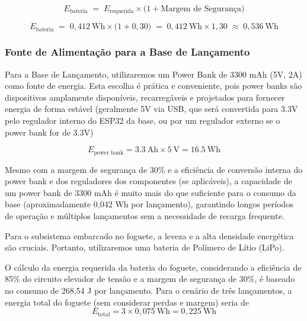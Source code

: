 \begin{equation}
E_{\text{bateria}}
\;=\;
E_{\text{requerida}}
\times
\bigl(1 + \text{Margem de Segurança}\bigr)
\end{equation}

\begin{equation}
E_{\text{bateria}}
\;=\;
0,412~\mathrm{Wh}
\times
\bigl(1 + 0{,}30\bigr)
\;=\;
0,412~\mathrm{Wh}
\times
1{,}30
\;\approx\;
0,536~\mathrm{Wh}
\end{equation}

\subsubsection{Fonte de Alimentação para a Base de Lançamento}


Para a Base de Lançamento, utilizaremos um Power Bank de 3300 mAh (5V, 2A) como fonte de energia. Esta escolha é prática e conveniente, pois power banks são dispositivos amplamente disponíveis, recarregáveis e projetados para fornecer energia de forma estável (geralmente 5V via USB, que será convertida para 3.3V pelo regulador interno do ESP32 da base, ou por um regulador externo se o power bank for de 3.3V) 

\begin{equation}
E_{\text{power bank}}
= 3.3~\mathrm{Ah} \times 5~\mathrm{V}
= 16.5~\mathrm{Wh}
\end{equation}

Mesmo com a margem de segurança de 30\% e a eficiência de conversão interna do power bank e dos reguladores dos componentes (se aplicáveis), a capacidade de um power bank de 3300 mAh é muito mais do que suficiente para o consumo da base (aproximadamente 0,042 Wh por lançamento), garantindo longos períodos de operação e múltiplos lançamentos sem a necessidade de recarga frequente. 


Para o subsistema embarcado no foguete, a leveza e a alta densidade energética são cruciais. Portanto, utilizaremos uma bateria de Polímero de Lítio (LiPo). 

O cálculo da energia requerida da bateria do foguete, considerando a eficiência de 85\% do circuito elevador de tensão e a margem de segurança de 30\%, é baseado no consumo de 268,54 J por lançamento. Para o cenário de três lançamentos, a energia total do foguete (sem considerar perdas e margem) seria de
\begin{equation}
E_{\text{total}} = 3 \times 0{,}075~\mathrm{Wh} = 0{,}225~\mathrm{Wh}
\end{equation}

